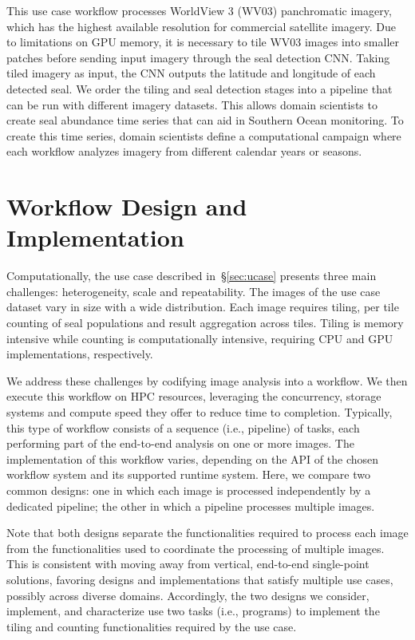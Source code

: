 This use case workflow processes WorldView 3 (WV03) panchromatic imagery, which has the highest available resolution for commercial satellite imagery.
Due to limitations on GPU memory, it is necessary to tile WV03 images into smaller patches before sending input imagery through the seal detection CNN.
Taking tiled imagery as input, the CNN outputs the latitude and longitude of each detected seal.
We order the tiling and seal detection stages into a pipeline that can be run with different imagery datasets.
This allows domain scientists to create seal abundance time series that can aid in Southern Ocean monitoring.
To create this time series, domain scientists define a computational campaign where each workflow analyzes imagery from different calendar years or seasons.


\section{Workflow Design and Implementation}\label{sec:design}
Computationally, the use case described in~\S\ref{sec:ucase} presents three main challenges: heterogeneity, scale and repeatability.
The images of the use case dataset vary in size with a wide distribution.
Each image requires tiling, per tile counting of seal populations and result aggregation across tiles.
Tiling is memory intensive while counting is computationally intensive, requiring CPU and GPU implementations, respectively.

We address these challenges by codifying image analysis into a workflow.
We then execute this workflow on HPC resources, leveraging the concurrency, storage systems and compute speed they offer to reduce time to completion.
Typically, this type of workflow consists of a sequence (i.e., pipeline) of tasks, each performing part of the end-to-end analysis on one or more images.
The implementation of this workflow varies, depending on the API of the chosen workflow system and its supported runtime system.
Here, we compare two common designs: one in which each image is processed independently by a dedicated pipeline; the other in which a pipeline processes multiple images.

Note that both designs separate the functionalities required to process each image from the functionalities used to coordinate the processing of multiple images.
This is consistent with moving away from vertical, end-to-end single-point solutions, favoring designs and implementations that satisfy multiple use cases, possibly across diverse domains.
Accordingly, the two designs we consider, implement, and characterize use two tasks (i.e., programs) to implement the tiling and counting functionalities required by the use case.

